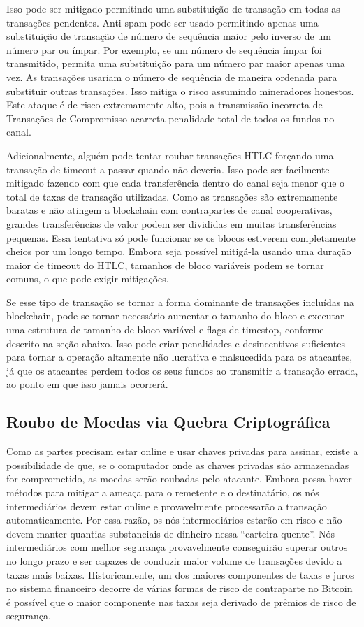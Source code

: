 \documentclass[letterpaper,11pt]{article}
\begin{document}
Isso pode ser mitigado permitindo uma substituição de transação em todas as
transações pendentes. Anti-spam pode ser usado permitindo apenas uma
substituição de transação de número de sequência maior pelo inverso de um
número par ou ímpar. Por exemplo, se um número de sequência ímpar foi
transmitido, permita uma substituição para um número par maior apenas uma
vez. As transações usariam o número de sequência de maneira ordenada para
substituir outras transações. Isso mitiga o risco assumindo mineradores
honestos. Este ataque é de risco extremamente alto, pois a transmissão
incorreta de Transações de Compromisso acarreta penalidade total de todos
os fundos no canal.

Adicionalmente, alguém pode tentar roubar transações HTLC forçando uma
transação de timeout a passar quando não deveria. Isso pode ser facilmente
mitigado fazendo com que cada transferência dentro do canal seja menor que
o total de taxas de transação utilizadas. Como as transações são
extremamente baratas e não atingem a blockchain com contrapartes de canal
cooperativas, grandes transferências de valor podem ser divididas em muitas
transferências pequenas. Essa tentativa só pode funcionar se os blocos
estiverem completamente cheios por um longo tempo. Embora seja possível
mitigá-la usando uma duração maior de timeout do HTLC, tamanhos de bloco
variáveis podem se tornar comuns, o que pode exigir mitigações.

Se esse tipo de transação se tornar a forma dominante de transações
incluídas na blockchain, pode se tornar necessário aumentar o tamanho do
bloco e executar uma estrutura de tamanho de bloco variável e flags de
timestop, conforme descrito na seção abaixo. Isso pode criar penalidades e
desincentivos suficientes para tornar a operação altamente não lucrativa e
malsucedida para os atacantes, já que os atacantes perdem todos os seus
fundos ao transmitir a transação errada, ao ponto em que isso jamais
ocorrerá.

\subsection{Roubo de Moedas via Quebra Criptográfica}

Como as partes precisam estar online e usar chaves privadas para assinar,
existe a possibilidade de que, se o computador onde as chaves privadas são
armazenadas for comprometido, as moedas serão roubadas pelo atacante.
Embora possa haver métodos para mitigar a ameaça para o remetente e o
destinatário, os nós intermediários devem estar online e provavelmente
processarão a transação automaticamente. Por essa razão, os nós
intermediários estarão em risco e não devem manter quantias substanciais de
dinheiro nessa ``carteira quente''. Nós intermediários com melhor segurança
provavelmente conseguirão superar outros no longo prazo e ser capazes de
conduzir maior volume de transações devido a taxas mais baixas.
Historicamente, um dos maiores componentes de taxas e juros no sistema
financeiro decorre de várias formas de risco de contraparte \textemdash no
Bitcoin é possível que o maior componente nas taxas seja derivado de prêmios
de risco de segurança.
\end{document}
